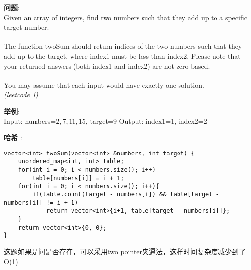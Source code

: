     
\begin{description}
    \item{\textbf{问题}}:\\
Given an array of integers, find two numbers such that they add up to a specific target number.\\
\\
The function twoSum should return indices of the two numbers such that they add up to the target, where index1 must be less than index2. Please note that your returned answers (both index1 and index2) are not zero-based.\\
\\
You may assume that each input would have exactly one solution.\\
\textit{(leetcode 1)}
    \item{\textbf{举例}}:\\
Input: numbers=${2, 7, 11, 15}$, target=9
Output: index1=1, index2=2
    \item{\textbf{哈希}} : 
    \begin{lstlisting}
vector<int> twoSum(vector<int> &numbers, int target) {
	unordered_map<int, int> table;
	for(int i = 0; i < numbers.size(); i++)
		table[numbers[i]] = i + 1;
	for(int i = 0; i < numbers.size(); i++){
		if(table.count(target - numbers[i]) && table[target - numbers[i]] != i + 1)
			return vector<int>{i+1, table[target - numbers[i]]};
	}
	return vector<int>{0, 0};
}
    \end{lstlisting}
	这题如果是问是否存在，可以采用two pointer夹逼法，这样时间复杂度减少到了O(1)
\end{description}
